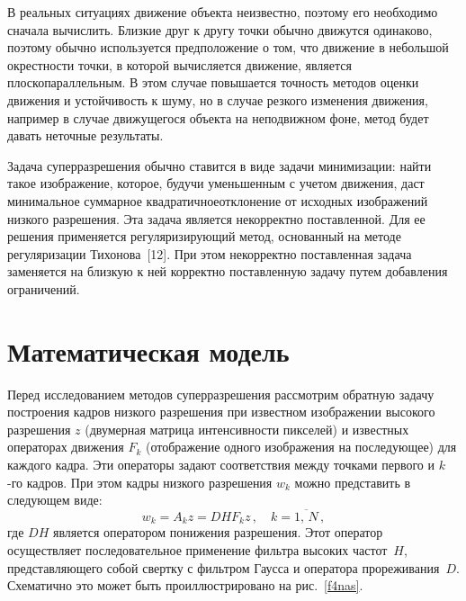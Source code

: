 \begin{multicols}{2}
     В реальных ситуациях движение объекта неизвестно, поэтому его необходимо
сначала вы\-чис\-лить. Близкие друг к другу точки обычно движутся одинаково, поэтому
обычно используется предположение о том, что движение в небольшой окрестности
точки, в которой вычисляется движение, является плоскопараллельным. В этом случае
повышается точность методов оценки движения и устойчивость к шуму, но в случае
резкого изменения движения, например в случае движущегося объекта на
неподвижном фоне, метод будет давать неточные результаты.

     Задача суперразрешения обычно ставится в виде задачи минимизации: найти
такое изображение, которое, будучи уменьшенным с учетом движения, даст
минимальное суммарное квадратичное\linebreak отклонение от исходных изображений низкого\linebreak
разрешения. Эта задача является некорректно поставленной. Для ее решения
применяется ре\-гу\-ля\-ри\-зи\-ру\-ющий метод, основанный на методе регуляризации
Тихонова~[12]. При этом некорректно поставленная задача заменяется на близкую к
ней корректно поставленную задачу путем добавления ограничений.

     \section{Математическая модель}

     Перед исследованием методов суперразрешения рассмотрим обратную задачу
построения кад\-ров низкого разрешения при известном изображении высокого
разрешения $z$ (двумерная матрица интенсивности пикселей) и известных операторах
движения $F_k$ (отображение одного изображения на последующее) для каждого
кадра. Эти операторы задают соответствия между точками первого и $k$-го кадров.
При этом кадры низкого разрешения $w_k$ можно представить в следующем виде:
     \begin{equation}
w_k = A_k z=DHF_kz\,,\quad k=\overline{1,\,N}\,,
     \label{e1nas}
     \end{equation}
где $DH$ является оператором понижения разрешения. Этот оператор осуществляет
последовательное применение фильтра высоких частот~$H$, пред\-став\-ля\-юще\-го собой
свертку с фильтром Гаусса и оператора прореживания~$D$. Схематично это может
быть проиллюстрировано на рис.~\ref{f4nas}.

\begin{figure*} %
\vspace*{1pt}
\begin{center}
\mbox{%
\epsfxsize=120.835mm
}
\end{center}
\vspace*{-9pt}
\vspace*{6pt}
\end{figure*}


\end{multicols}
